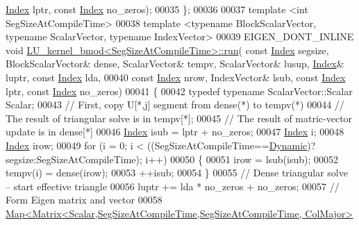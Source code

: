 \begin{DoxyCode}
      \hyperlink{namespace_eigen_a62e77e0933482dafde8fe197d9a2cfde}{Index} lptr, \textcolor{keyword}{const} \hyperlink{namespace_eigen_a62e77e0933482dafde8fe197d9a2cfde}{Index} no\_zeros);
00035 \};
00036 
00037 \textcolor{keyword}{template} <\textcolor{keywordtype}{int} SegSizeAtCompileTime>
00038 \textcolor{keyword}{template} <\textcolor{keyword}{typename} BlockScalarVector, \textcolor{keyword}{typename} ScalarVector, \textcolor{keyword}{typename} IndexVector>
00039 EIGEN\_DONT\_INLINE \textcolor{keywordtype}{void} \hyperlink{struct_eigen_1_1internal_1_1_l_u__kernel__bmod}{LU\_kernel\_bmod<SegSizeAtCompileTime>::run}(\textcolor{keyword}{
      const} \hyperlink{namespace_eigen_a62e77e0933482dafde8fe197d9a2cfde}{Index} segsize, BlockScalarVector& dense, ScalarVector& tempv, ScalarVector& lusup, 
      \hyperlink{namespace_eigen_a62e77e0933482dafde8fe197d9a2cfde}{Index}& luptr, \textcolor{keyword}{const} \hyperlink{namespace_eigen_a62e77e0933482dafde8fe197d9a2cfde}{Index} lda,
00040                                                                   \textcolor{keyword}{const} \hyperlink{namespace_eigen_a62e77e0933482dafde8fe197d9a2cfde}{Index} nrow, IndexVector& lsub,
       \textcolor{keyword}{const} \hyperlink{namespace_eigen_a62e77e0933482dafde8fe197d9a2cfde}{Index} lptr, \textcolor{keyword}{const} \hyperlink{namespace_eigen_a62e77e0933482dafde8fe197d9a2cfde}{Index} no\_zeros)
00041 \{
00042   \textcolor{keyword}{typedef} \textcolor{keyword}{typename} ScalarVector::Scalar Scalar;
00043   \textcolor{comment}{// First, copy U[*,j] segment from dense(*) to tempv(*)}
00044   \textcolor{comment}{// The result of triangular solve is in tempv[*]; }
00045     \textcolor{comment}{// The result of matric-vector update is in dense[*]}
00046   \hyperlink{namespace_eigen_a62e77e0933482dafde8fe197d9a2cfde}{Index} isub = lptr + no\_zeros; 
00047   \hyperlink{namespace_eigen_a62e77e0933482dafde8fe197d9a2cfde}{Index} i;
00048   \hyperlink{namespace_eigen_a62e77e0933482dafde8fe197d9a2cfde}{Index} irow;
00049   \textcolor{keywordflow}{for} (i = 0; i < ((SegSizeAtCompileTime==\hyperlink{namespace_eigen_ad81fa7195215a0ce30017dfac309f0b2}{Dynamic})?segsize:SegSizeAtCompileTime); i++)
00050   \{
00051     irow = lsub(isub); 
00052     tempv(i) = dense(irow); 
00053     ++isub; 
00054   \}
00055   \textcolor{comment}{// Dense triangular solve -- start effective triangle}
00056   luptr += lda * no\_zeros + no\_zeros; 
00057   \textcolor{comment}{// Form Eigen matrix and vector }
00058   \hyperlink{group___core___module_class_eigen_1_1_map}{Map<Matrix<Scalar,SegSizeAtCompileTime,SegSizeAtCompileTime, ColMajor>}

\end{DoxyCode}
